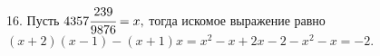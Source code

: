 16. Пусть $4357\cfrac{239}{9876}=x,$ тогда искомое выражение равно $(x+2)(x-1)-(x+1)x=x^2-x+2x-2-x^2-x=-2.$\\
